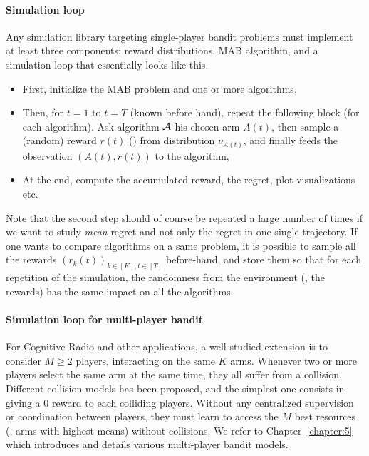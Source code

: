 \paragraph{Simulation loop}
%
Any simulation library targeting single-player bandit problems must implement at least three components:
reward distributions, MAB algorithm, and a simulation loop that essentially looks like this.
\begin{itemize}
    \item First, initialize the MAB problem and one or more algorithms,
    \item Then, for $t=1$ to $t=T$ (known before hand), repeat the following block (for each algorithm). Ask algorithm $\mathcal{A}$ his chosen arm $A(t)$, then sample a (random) reward $r(t)$ (\iid) from distribution $\nu_{A(t)}$, and finally feeds the observation $(A(t), r(t))$ to the algorithm,
    \item At the end, compute the accumulated reward, the regret, plot visualizations etc.
\end{itemize}
%
Note that the second step should of course be repeated a large number of times if we want to study \emph{mean} regret and not only the regret in one single trajectory.
If one wants to compare algorithms on a same problem, it is possible to sample all the rewards $(r_k(t))_{k\in[K], t\in[T]}$ before-hand, and store them so that for each repetition of the simulation, the randomness from the environment (\ie, the rewards) has the same impact on all the algorithms.


\paragraph{Simulation loop for multi-player bandit}

For Cognitive Radio and other applications, a well-studied extension is to consider $M\geq2$ players, interacting on the same $K$ arms.
Whenever two or more players select the same arm at the same time, they all suffer from a collision.
%
Different collision models has been proposed, and the simplest one consists in giving a $0$ reward to each colliding players.
Without any centralized supervision or coordination between players, they must learn to access the $M$ best resources (\ie, arms with highest means) without collisions.
We refer to Chapter~\ref{chapter:5} which introduces and details various multi-player bandit models.

